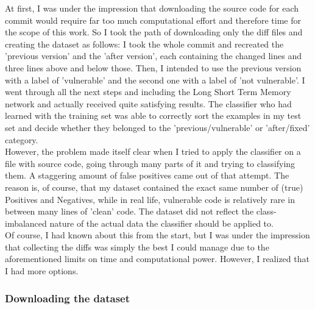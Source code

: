 \documentclass[
a4paper,
pagesize,
pdftex,
12pt,
twoside, %
BCOR=5mm, %
ngerman,
fleqn,
final,
]{scrartcl}
\begin{document}
	At first, I was under the impression that downloading the source code for each commit would require far too much computational effort and therefore time for the scope of this work. So I took the path of downloading only the diff files and creating the dataset as follows: I took the whole commit and recreated the 'previous version' and the 'after version', each containing the changed lines and three lines above and below those. Then, I intended to use the previous version with a label of 'vulnerable' and the second one with a label of 'not vulnerable'. I went through all the next steps and including the Long Short Term Memory network and actually received quite satisfying results. The classifier who had learned with the training set was able to correctly sort the examples in my test set and decide whether they belonged to the 'previous/vulnerable' or 'after/fixed' category.\\
	However, the problem made itself clear when I tried to apply the classifier on a file with source code, going through many parts of it and trying to classifying them. A staggering amount of false positives came out of that attempt. The reason is, of course, that my dataset contained the exact same number of (true) Positives and Negatives, while in real life, vulnerable code is relatively rare in between many lines of 'clean' code. The dataset did not reflect the class-imbalanced nature of the actual data the classifier should be applied to.\\
	Of course, I had known about this from the start, but I was under the impression that collecting the diffs was simply the best I could manage due to the aforementioned limits on time and computational power. However, I realized that I had more options.
	
	
	\subsubsection{Downloading the dataset}
	
\end{document}
